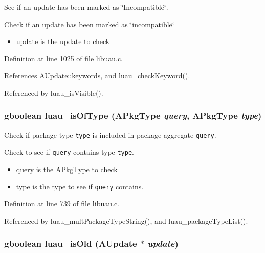 See if an update has been marked as \char`\"{}Incompatible\char`\"{}. 

Check if an update has been marked as \char`\"{}incompatible\char`\"{}

\begin{itemize}
\item update is the update to check 
\end{itemize}


Definition at line 1025 of file libuau.c.

References AUpdate::keywords, and luau\_\-check\-Keyword().

Referenced by luau\_\-is\-Visible().
\subsubsection{\setlength{\rightskip}{0pt plus 5cm}gboolean luau\_\-is\-Of\-Type ({\bf APkg\-Type} {\em query}, {\bf APkg\-Type} {\em type})}\label{libuau_8c_a22}


Check if package type {\tt type} is included in package aggregate {\tt query}. 

Check to see if {\tt query} contains type {\tt type}.

\begin{itemize}
\item query is the APkg\-Type to check \item type is the type to see if {\tt query} contains. 
\end{itemize}


Definition at line 739 of file libuau.c.

Referenced by luau\_\-mult\-Package\-Type\-String(), and luau\_\-package\-Type\-List().
\subsubsection{\setlength{\rightskip}{0pt plus 5cm}gboolean luau\_\-is\-Old ({\bf AUpdate} $\ast$ {\em update})}\label{libuau_8c_a36}



